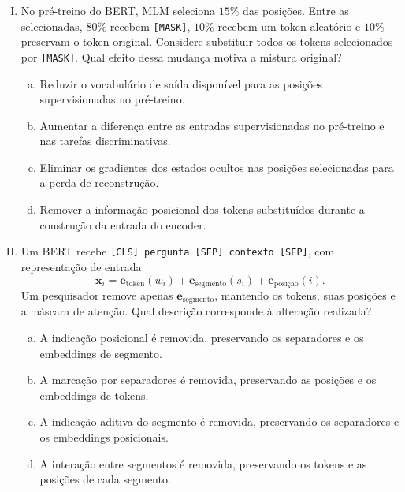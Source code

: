 \documentclass{dlproblemset}
\begin{document}
\begin{enumerate}[I)]
\begin{enumerate}[a)]
    \item $589\,824$
    \item $1\,769\,472$
    \item $2\,359\,296$
    \item $4\,718\,592$
\end{enumerate}

\item No pré-treino do BERT, MLM seleciona $15\%$ das posições.
      Entre as selecionadas, $80\%$ recebem \texttt{[MASK]}, $10\%$
      recebem um token aleatório e $10\%$ preservam o token original.
      Considere substituir todos os tokens selecionados por \texttt{[MASK]}.
      Qual efeito dessa mudança motiva a mistura original?

\begin{enumerate}[a)]
    \item Reduzir o vocabulário de saída disponível para as posições supervisionadas no pré-treino.
    \item Aumentar a diferença entre as entradas supervisionadas no pré-treino e nas tarefas discriminativas.
    \item Eliminar os gradientes dos estados ocultos nas posições selecionadas para a perda de reconstrução.
    \item Remover a informação posicional dos tokens substituídos durante a construção da entrada do encoder.
\end{enumerate}

\item Um BERT recebe \texttt{[CLS] pergunta [SEP] contexto [SEP]},
      com representação de entrada
      \[
        \mathbf{x}_i=\mathbf e_{\text{token}}(w_i)
          +\mathbf e_{\text{segmento}}(s_i)+\mathbf e_{\text{posição}}(i).
      \]
      Um pesquisador remove apenas $\mathbf e_{\text{segmento}}$, mantendo
      os tokens, suas posições e a máscara de atenção.
      Qual descrição corresponde à alteração realizada?

\begin{enumerate}[a)]
    \item A indicação posicional é removida, preservando os separadores e os embeddings de segmento.
    \item A marcação por separadores é removida, preservando as posições e os embeddings de tokens.
    \item A indicação aditiva do segmento é removida, preservando os separadores e os embeddings posicionais.
    \item A interação entre segmentos é removida, preservando os tokens e as posições de cada segmento.
\end{enumerate}


\end{enumerate}
\end{document}
